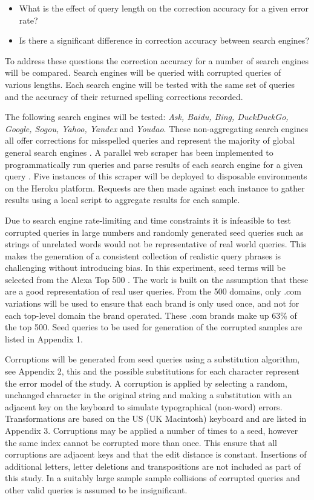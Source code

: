 \documentclass{csfourzero}
\begin{document}
\begin{itemize}
  \item{What is the effect of query length on the correction accuracy for a given error rate?}
  \item{Is there a significant difference in correction accuracy between search engines?}
\end{itemize}

\noindent
To address these questions the correction accuracy for a number of search engines will be compared. Search engines will be queried with corrupted queries of various lengths. Each search engine will be tested with the same set of queries and the accuracy of their returned spelling corrections recorded.

The following search engines will be tested: \textit{Ask, Baidu, Bing, DuckDuckGo, Google, Sogou, Yahoo, Yandex} and \textit{Youdao}. These non-aggregating search engines all offer corrections for misspelled queries and represent the majority of global general search engines \cite{searchenginewiki}. A parallel web scraper has been implemented to programmatically run queries and parse results of each search engine for a given query \cite{scraper}. Five instances of this scraper will be deployed to disposable environments on the Heroku platform. Requests are then made against each instance to gather results using a local script to aggregate results for each sample.

Due to search engine rate-limiting and time constraints it is infeasible to test corrupted queries in large numbers and randomly generated seed queries such as strings of unrelated words would not be representative of real world queries. This makes the generation of a consistent collection of realistic query phrases is challenging without introducing bias. In this experiment, seed terms will be selected from the Alexa Top 500 \cite{alexatop500}. The work is built on the assumption that these are a good representation of real user queries. From the 500 domains, only .com variations will be used to ensure that each brand is only used once, and not for each top-level domain the brand operated. These .com brands make up 63\% of the top 500. Seed queries to be used for generation of the corrupted samples are listed in Appendix 1.

Corruptions will be generated from seed queries using a substitution algorithm, see Appendix 2, this and the possible substitutions for each character represent the error model of the study. A corruption is applied by selecting a random, unchanged character in the original string and making a substitution with an adjacent key on the keyboard to simulate typographical (non-word) errors. Transformations are based on the US (UK Macintosh) keyboard and are listed in Appendix 3. Corruptions may be applied a number of times to a seed, however the same index cannot be corrupted more than once. This ensure that all corruptions are adjacent keys and that the edit distance is constant. Insertions of additional letters, letter deletions and transpositions are not included as part of this study. In a suitably large sample sample collisions of corrupted queries and other valid queries is assumed to be insignificant.
\end{document}
